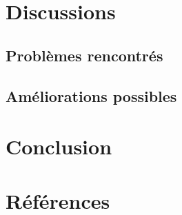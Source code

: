 \documentclass[a4paper, 12pt]{article}
\begin{document}
\newpage

\section{Discussions}
\subsection{Problèmes rencontrés}


\subsection{Améliorations possibles}

\newpage

\section{Conclusion}

\newpage

\section{Références}
\nocite{*}


\end{document}
